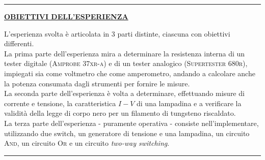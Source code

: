\documentclass{article}
\begin{document}
\hrule
\begin{center}
\textbf{\underline{\large OBIETTIVI DELL'ESPERIENZA}}
\end{center}
L'esperienza svolta è articolata in 3 parti distinte, ciascuna con obiettivi differenti.\\
La prima parte dell'esperienza mira a determinare la resistenza interna di un tester digitale (\textsc{Amprobe 37xr-a}) e di un tester analogico (\textsc{Supertester 680r}), impiegati sia come voltmetro che come amperometro, andando a calcolare anche la potenza consumata dagli strumenti per fornire le misure.\\
La seconda parte dell'esperienza è volta a determinare, effettuando misure di corrente e tensione, la caratteristica \(I-V\) di una lampadina e a verificare la validità della legge di corpo nero per un filamento di tungsteno riscaldato.\\
La terza parte dell'esperienza - puramente operativa - consiste nell'implementare, utilizzando due switch, un generatore di tensione e una lampadina, un circuito \textsc{And}, un circuito \textsc{Or} e un circuito \textit{two-way switching}.
\\
\hrule
\end{document}
